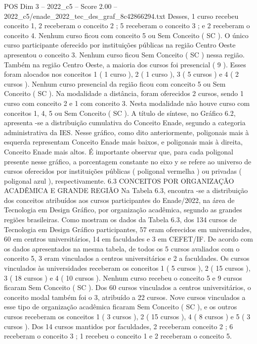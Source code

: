 \begin{textsample}{POS Dim 3 – 2022\_c5 – Score 2.00 – 2022\_c5/enade\_2022\_tec\_des\_graf\_8c42866294.txt}
Desses, 1 curso recebeu conceito 1, 2 receberam o conceito 2 ; 5 receberam o conceito 3 ; e 2 receberam o conceito 4.
Nenhum curso ficou com conceito 5 ou Sem Conceito ( SC ).
O único curso participante oferecido por instituições públicas na região Centro Oeste apresentou o conceito 3.
Nenhum curso ficou Sem Conceito ( SC ) nessa região.
Também na região Centro Oeste, a maioria dos cursos foi presencial ( 9 ).
Esses foram alocados nos conceitos 1 ( 1 curso ), 2 ( 1 curso ), 3 ( 5 cursos ) e 4 ( 2 cursos ).
Nenhum curso presencial da região ficou com conceito 5 ou Sem Conceito ( SC ).
Na modalidade a distância, foram oferecidos 2 cursos, sendo 1 curso com conceito 2 e 1 com conceito 3.
Nesta modalidade não houve curso com conceitos 1, 4, 5 ou Sem Conceito ( SC ).
A título de síntese, no Gráfico 6.2, apresenta -se a distribuição cumulativa do Conceito Enade, segundo a categoria administrativa da IES.
Nesse gráfico, como dito anteriormente, poligonais mais à esquerda representam Conceito Enade mais baixos, e poligonais mais à direita, Conceito Enade mais altos.
É importante observar que, para cada poligonal presente nesse gráfico, a porcentagem constante no eixo y se refere ao universo de cursos oferecidos por instituições públicas ( poligonal vermelha ) ou privadas ( poligonal azul ), respectivamente. 6.3 CONCEITOS POR ORGANIZAÇÃO ACADÊMICA E GRANDE REGIÃO Na Tabela 6.3, encontra -se a distribuição dos conceitos atribuídos aos cursos participantes do Enade/2022, na área de Tecnologia em Design Gráfico, por organização acadêmica, segundo as grandes regiões brasileiras.
Como mostram os dados da Tabela 6.3, dos 134 cursos de Tecnologia em Design Gráfico participantes, 57 eram oferecidos em universidades, 60 em centros universitários, 14 em faculdades e 3 em CEFET/IF.
De acordo com os dados apresentados na mesma tabela, de todos os 5 cursos avaliados com o conceito 5, 3 eram vinculados a centros universitários e 2 a faculdades.
Os cursos vinculados às universidades receberam os conceitos 1 ( 5 cursos ), 2 ( 15 cursos ), 3 ( 18 cursos ) e 4 ( 10 cursos ).
Nenhum curso recebeu o conceito 5 e 9 cursos ficaram Sem Conceito ( SC ).
Dos 60 cursos vinculados a centros universitários, o conceito modal também foi o 3, atribuído a 22 cursos.
Nove cursos vinculados a esse tipo de organização acadêmica ficaram Sem Conceito ( SC ), e os outros cursos receberam os conceitos 1 ( 3 cursos ), 2 ( 15 cursos ), 4 ( 8 cursos ) e 5 ( 3 cursos ).
Dos 14 cursos mantidos por faculdades, 2 receberam conceito 2 ; 6 receberam o conceito 3 ; 1 recebeu o conceito 1 e 2 receberam o conceito 5.

\end{textsample}
